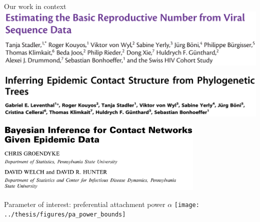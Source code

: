 \documentclass{beamer}
\begin{document}
\begin{frame}{Our work in context}
  \vspace{-0.5cm}
  \colorbox{blue0}{\includegraphics[width=\textwidth]{figures/stadler2011estimating}}

  \pause
  \colorbox{blue0}{\includegraphics[width=\textwidth]{figures/leventhal2012inferring}}

  \pause
  \colorbox{blue0}{\includegraphics[width=0.75\textwidth]{figures/groendyke2011bayesian}}
\end{frame}

\begin{frame}{Parameter of interest: preferential attachment power $\alpha$}
  \vspace{-0.5cm}
  \texttt{[image: ../thesis/figures/pa\_power\_bounds]}
\end{frame}
\end{document}
